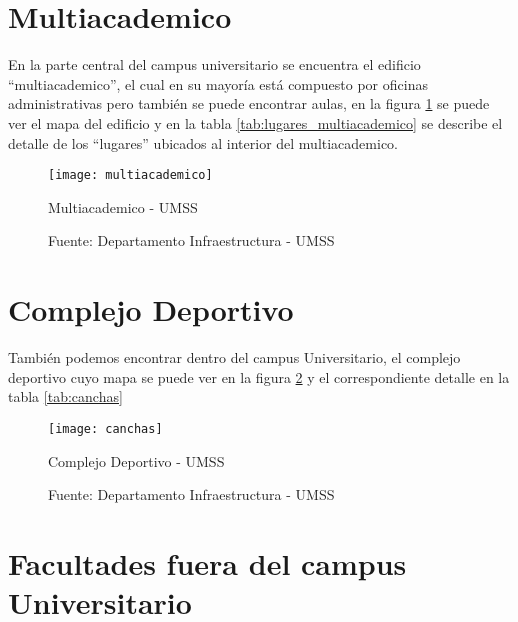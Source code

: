 % 

\section{Multiacademico}
\label{sec:multiacademico}

En la parte central del campus universitario se encuentra el edificio ``multiacademico'', el cual en su mayoría está compuesto por oficinas administrativas pero también se puede encontrar aulas, en la figura \ref{fig:multiacademico} se puede ver el mapa del edificio y en la tabla  \ref{tab:lugares_multiacademico} se describe el detalle de los ``lugares'' ubicados al interior del multiacademico.
\\

\begin{figure}[H]
 \begin{center}
   \texttt{[image: multiacademico]}
   \caption{Multiacademico - UMSS}
   \label{fig:multiacademico}
   \caption*{Fuente: Departamento Infraestructura - UMSS}
 \end{center}
\end{figure}

\newpage

% 

\newpage

\section{Complejo Deportivo}
\label{sec:canchas}

También podemos encontrar dentro del campus Universitario, el complejo deportivo cuyo mapa se puede ver en la figura \ref{fig:canchas} y el correspondiente detalle en la tabla \ref{tab:canchas}

\begin{figure}[H]
 \begin{center}
   \texttt{[image: canchas]}
   \caption{Complejo Deportivo - UMSS}
   \label{fig:canchas}
   \caption*{Fuente: Departamento Infraestructura - UMSS}
 \end{center}
\end{figure}




\section{Facultades fuera del campus Universitario}
\label{sec:Facultades fuera del campus Universitario}

